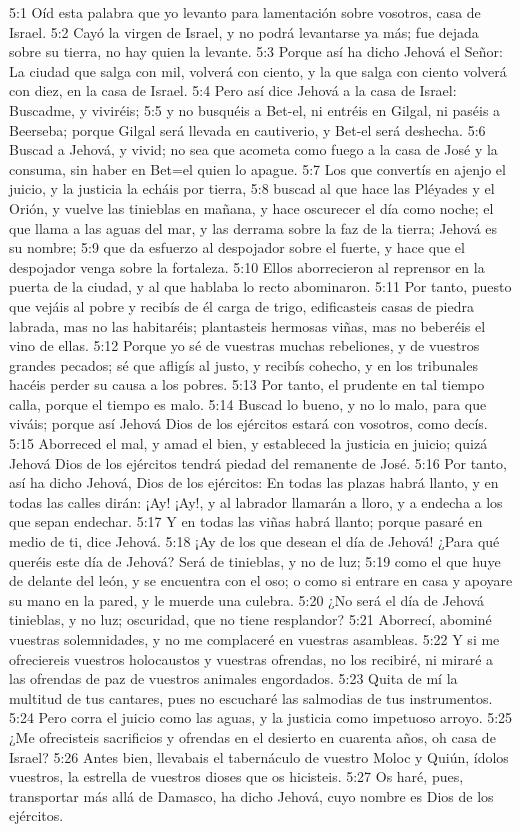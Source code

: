 5:1 Oíd esta palabra que yo levanto para lamentación sobre vosotros, casa de Israel.   
5:2 Cayó la virgen de Israel, y no podrá levantarse ya más; fue dejada sobre su tierra, no hay quien la levante.   
5:3 Porque así ha dicho Jehová el Señor: La ciudad que salga con mil, volverá con ciento, y la que salga con ciento volverá con diez, en la casa de Israel.   
5:4 Pero así dice Jehová a la casa de Israel: Buscadme, y viviréis;   
5:5 y no busquéis a Bet-el, ni entréis en Gilgal, ni paséis a Beerseba; porque Gilgal será llevada en cautiverio, y Bet-el será deshecha.   
5:6 Buscad a Jehová, y vivid; no sea que acometa como fuego a la casa de José y la consuma, sin haber en Bet=el quien lo apague.   
5:7 Los que convertís en ajenjo el juicio, y la justicia la echáis por tierra,   
5:8 buscad al que hace las Pléyades y el Orión, y vuelve las tinieblas en mañana, y hace oscurecer el día como noche; el que llama a las aguas del mar, y las derrama sobre la faz de la tierra; Jehová es su nombre;   
5:9 que da esfuerzo al despojador sobre el fuerte, y hace que el despojador venga sobre la fortaleza.   
5:10 Ellos aborrecieron al reprensor en la puerta de la ciudad, y al que hablaba lo recto abominaron.   
5:11 Por tanto, puesto que vejáis al pobre y recibís de él carga de trigo, edificasteis casas de piedra labrada, mas no las habitaréis; plantasteis hermosas viñas, mas no beberéis el vino de ellas.   
5:12 Porque yo sé de vuestras muchas rebeliones, y de vuestros grandes pecados; sé que afligís al justo, y recibís cohecho, y en los tribunales hacéis perder su causa a los pobres.   
5:13 Por tanto, el prudente en tal tiempo calla, porque el tiempo es malo.   
5:14 Buscad lo bueno, y no lo malo, para que viváis; porque así Jehová Dios de los ejércitos estará con vosotros, como decís.   
5:15 Aborreced el mal, y amad el bien, y estableced la justicia en juicio; quizá Jehová Dios de los ejércitos tendrá piedad del remanente de José.   
5:16 Por tanto, así ha dicho Jehová, Dios de los ejércitos: En todas las plazas habrá llanto, y en todas las calles dirán: ¡Ay! ¡Ay!, y al labrador llamarán a lloro, y a endecha a los que sepan endechar.   
5:17 Y en todas las viñas habrá llanto; porque pasaré en medio de ti, dice Jehová.   
5:18 ¡Ay de los que desean el día de Jehová! ¿Para qué queréis este día de Jehová? Será de tinieblas, y no de luz;   
5:19 como el que huye de delante del león, y se encuentra con el oso; o como si entrare en casa y apoyare su mano en la pared, y le muerde una culebra.   
5:20 ¿No será el día de Jehová tinieblas, y no luz; oscuridad, que no tiene resplandor?   
5:21 Aborrecí, abominé vuestras solemnidades, y no me complaceré en vuestras asambleas.   
5:22 Y si me ofreciereis vuestros holocaustos y vuestras ofrendas, no los recibiré, ni miraré a las ofrendas de paz de vuestros animales engordados. 
5:23 Quita de mí la multitud de tus cantares, pues no escucharé las salmodias de tus instrumentos.   
5:24 Pero corra el juicio como las aguas, y la justicia como impetuoso arroyo.   
5:25 ¿Me ofrecisteis sacrificios y ofrendas en el desierto en cuarenta años, oh casa de Israel?   
5:26 Antes bien, llevabais el tabernáculo de vuestro Moloc y Quiún, ídolos vuestros, la estrella de vuestros dioses que os hicisteis.   
5:27 Os haré, pues, transportar más allá de Damasco, ha dicho Jehová, cuyo nombre es Dios de los ejércitos.   
